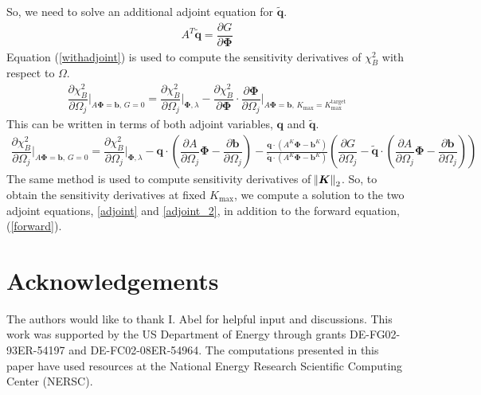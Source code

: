 \documentclass[aps,unsortedaddress]{revtex4-1}
\newcommand{\partder}[2]{\dfrac{\partial  #1}{\partial  #2}}
\begin{document}
So, we need to solve an additional adjoint equation for $\tilde{\bm{q}}$.
\begin{gather}
A^T \tilde{\bm{q}} = \partder{G}{\bm{\Phi}}
\label{adjoint_2}
\end{gather}
Equation (\ref{withadjoint}) is used to compute the sensitivity derivatives of $\chi^2_B$ with respect to $\Omega$.
\begin{gather}
\partder{\chi^2_B}{\Omega_j} \bigg \rvert_{A \bm{\Phi} = \bm{b}, \, G = 0} = \partder{\chi^2_B}{\Omega_j} \bigg \rvert_{\bm{\Phi}, \lambda} - \partder{\chi^2_B}{\bm{\Phi}} \cdot \partder{\bm{\Phi}}{\Omega_j} \bigg \rvert_{A \bm{\Phi} = \bm{b}, \, K_{\text{max}} = K_{\text{max}}^{\text{target}}}
\end{gather}
This can be written in terms of both adjoint variables, $\bm{q}$ and $\tilde{\bm{q}}$. 
\begin{multline}
\partder{\chi^2_B}{\Omega_j} \bigg \rvert_{A \bm{\Phi} = \bm{b}, \, G = 0} = \partder{\chi^2_B}{\Omega_j} \bigg \rvert_{\bm{\Phi}, \lambda} - \bm{q} \cdot \left( \partder{A}{\Omega_j} \bm{\Phi} - \partder{\bm{b}}{\Omega_j} \right) - \frac{ \bm{q} \cdot \left(A^K \bm{\Phi} - \bm{b}^K \right)}{  \tilde{\bm{q}} \cdot \left( A^K \bm{\Phi} - \bm{b}^K \right) } \left( \partder{G}{\Omega_j} - \tilde{\bm{q}} \cdot \left( \partder{A}{\Omega_j} \bm{\Phi} - \partder{\bm{b}}{\Omega_j} \right) \right)
\end{multline}
The same method is used to compute sensitivity derivatives of $\norm{\bm{K}}_2$. So, to obtain the sensitivity derivatives at fixed $K_{\text{max}}$, we compute a solution to the two adjoint equations, \ref{adjoint} and \ref{adjoint_2}, in addition to the forward equation, (\ref{forward}).

\section*{Acknowledgements}
The authors would like to thank I. Abel for helpful input and discussions. This work was supported by the US Department of Energy through grants DE-FG02-93ER-54197 and DE-FC02-08ER-54964. The computations presented in this paper have used resources at the National Energy Research Scientific Computing Center (NERSC). 

\raggedright


\end{document}

